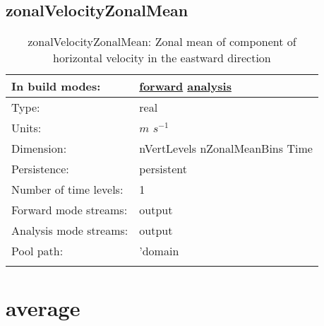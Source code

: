 \subsection[zonalVelocityZonalMean]{zonalVelocityZonalMean}
\label{subsec:var_sec_amZonalMean_zonalVelocityZonalMean}
\begin{center}
\begin{longtable}{| p{2.0in} | p{4.0in} |}
        \hline 
        In build modes: & \hyperref[subsec:forward_var_tab_amZonalMean]{forward} \hyperref[subsec:analysis_var_tab_amZonalMean]{analysis} \\
        \hline 
        Type: & real \\
        \hline 
        Units: & $m$ $s^{-1}$ \\
        \hline 
        Dimension: & nVertLevels nZonalMeanBins Time \\
        \hline 
        Persistence: & persistent \\
        \hline 
        Number of time levels: & 1 \\
        \hline 
		 Forward mode streams: &  output \\
        \hline 
		 Analysis mode streams: &  output \\
        \hline 
            Pool path: & 'domain %
 \\
		 \hline 
    \caption{zonalVelocityZonalMean: Zonal mean of component of horizontal velocity in the eastward direction}
\end{longtable}
\end{center}
\section[average]{average}
\label{sec:var_sec_average}
